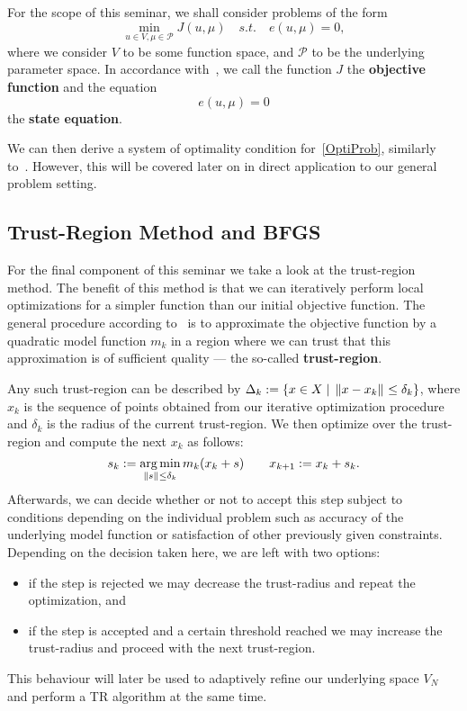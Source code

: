 For the scope of this seminar, we shall consider problems of the form
\begin{equation}\label{OptiProb}
    \min\limits_{u \in V, \mu \in \mathcal{P}} J(u, \mu) \quad s.t. \quad e(u, \mu) = 0,
\end{equation}
where we consider $V$ to be some function space, and $\mathcal{P}$ to be the underlying parameter space.
In accordance with~\cite[Subsection 1.1.1 and Equation 1.4; Section 1.6 and Equation 1.81]{Hinze2009}, we call the function $J$ the \textbf{objective function} and the equation
\begin{equation}\label{StateEq}
    e(u, \mu) = 0
\end{equation}
the \textbf{state equation}.

We can then derive a system of optimality condition for~\eqref{OptiProb}, similarly to~\cite[Section 1.7]{Hinze2009}.
However, this will be covered later on in direct application to our general problem setting.

\subsection{Trust-Region Method and BFGS}

For the final component of this seminar we take a look at the trust-region method.
The benefit of this method is that we can iteratively perform local optimizations for a simpler function than our initial objective function.
The general procedure according to~\cite[Section 3.3]{Kelley1999} is to approximate the objective function by a quadratic model function $m_k$ in a region where we can trust that this approximation is of sufficient quality --- the so-called \textbf{trust-region}.

Any such trust-region can be described by $\Delta_k := \{ x \in X \; | \; \left\lVert x - x_k\right\rVert_{} \leq \delta_k \}$, where $x_k$ is the sequence of points obtained from our iterative optimization procedure and $\delta_k$ is the radius of the current trust-region.
We then optimize over the trust-region and compute the next $x_k$ as follows:
\begin{equation*}\label{TROpti}
    s_k := \operatorname*{arg\,min}\limits_{\left\lVert s\right\rVert_{} \leq \delta_k} m_k(x_k + s) \qquad x_{k + 1} := x_k + s_k.
\end{equation*}
Afterwards, we can decide whether or not to accept this step subject to conditions depending on the individual problem such as accuracy of the underlying model function or satisfaction of other previously given constraints.
Depending on the decision taken here, we are left with two options:
\begin{itemize}
    \item if the step is rejected we may decrease the trust-radius and repeat the optimization, and
    \item if the step is accepted and a certain threshold reached we may increase the trust-radius and proceed with the next trust-region.
\end{itemize}
This behaviour will later be used to adaptively refine our underlying space $V_N$ and perform a TR algorithm at the same time.

